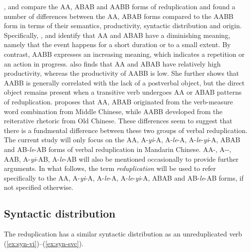  \citet{Fan1964}, \citet{Arcodiaetal2014}  and \citet{Xie2020} compare the AA, ABAB and AABB forms of reduplication 
and found a number of differences between the AA, ABAB forms compared to the AABB form in terms of their semantics, productivity, syntactic distribution and origin. 
Specifically, \citet[17--18]{Arcodiaetal2014}, \citet[144]{MelloniBasciano2018} and \citet[90]{Xie2020} identify that AA and ABAB have a diminishing meaning, 
namely that the event happens for a short duration or to a small extent. 
By contrast, AABB expresses an increasing meaning, which indicates a repetition or an action in progress. 
\citet[Sec.\,3.1]{Xie2020} also finds that AA and ABAB have relatively high productivity, 
whereas the productivity of AABB is low. 
She further shows that AABB is generally correlated with the lack of a postverbal object, but the direct object remains present when a transitive verb undergoes AA or ABAB patterns of reduplication. 
\citet[277]{Fan1964} proposes that AA, ABAB originated from the verb-measure word combination from Middle Chinese, 
while AABB developed from the reiterative rhetoric from Old Chinese. 
These differences seem to suggest that there is a fundmental difference between these two groups of verbal reduplication. 
The current study will only focus on the AA, A-\textit{yi}-A, A-\textit{le}-A, A-\textit{le}-\textit{yi}-A, ABAB and AB-\textit{le}-AB forms of verbal reduplication in Mandarin Chinese.
AA-, A--, AAB, A-\textit{yi}-AB, A-\textit{le}-AB will also be mentioned occasionally to provide further arguments.
In what follows, the term \textit{reduplication} will be used  to refer specifically to the AA, A\hyp{}\textit{yi}\hyp{}A, A-\textit{le}-A, A-\textit{le}-\textit{yi}-A, ABAB and AB-\textit{le}-AB forms, if not specified otherwise.




\subsection{Syntactic distribution}\label{sec:syn-dis}

The reduplication has a similar syntactic distribution as an unreduplicated verb (\ref{ex:syn-vi})--(\ref{ex:syn-svc}). 


